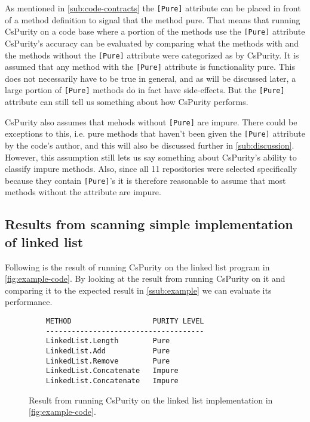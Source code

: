 \documentclass[a4paper,12pt]{article}
\begin{document}
As mentioned in \autoref{sub:code-contracts} the \texttt{[Pure]} attribute can be placed in front of a method definition to signal that the method pure. That means that running CsPurity on a code base where a portion of the methods use the \texttt{[Pure]} attribute CsPurity's accuracy can be evaluated by comparing what the methods with and the methods without the \texttt{[Pure]} attribute were categorized as by CsPurity. It is assumed that any method with the \texttt{[Pure]} attribute is functionality pure. This does not necessarily have to be true in general, and as will be discussed later, a large portion of \texttt{[Pure]} methods do in fact have side-effects. But the \texttt{[Pure]} attribute can still tell us something about how CsPurity performs.

CsPurity also assumes that mehods without \texttt{[Pure]} are impure. There could be exceptions to this, i.e. pure methods that haven't been given the \texttt{[Pure]} attribute by the code's author, and this will also be discussed further in \autoref{sub:discussion}. However, this assumption still lets us say something about CsPurity's ability to classify impure methods. Also, since all 11 repositories were selected specifically because they contain \texttt{[Pure]}'s it is therefore reasonable to assume that most methods without the attribute are impure.

\subsection{Results from scanning simple implementation of linked list} \label{sub:results-from-scanning-the-example-list}

Following is the result of running CsPurity on the linked list program in \autoref{fig:example-code}. By looking at the result from running CsPurity on it and comparing it to the expected result in \autoref{ssub:example} we can evaluate its performance.

\begin{figure}[htpb]
  \centering
  \begin{minipage}{\linewidth} %
    \begin{lstlisting}
    METHOD                   PURITY LEVEL
    -------------------------------------
    LinkedList.Length        Pure
    LinkedList.Add           Pure
    LinkedList.Remove        Pure
    LinkedList.Concatenate   Impure
    LinkedList.Concatenate   Impure
    \end{lstlisting}
  \end{minipage}
  \caption{Result from running CsPurity on the linked list implementation in \autoref{fig:example-code}.}
  \label{fig:example-result}
\end{figure}
\end{document}
